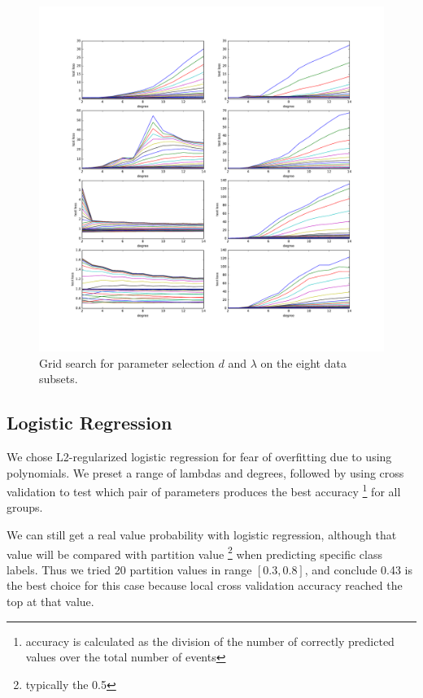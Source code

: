 \documentclass[10pt,conference,compsocconf]{IEEEtran}
\begin{document}
\begin{figure}[tbp] %
  \centering
  \includegraphics[width=\columnwidth]{img/cross_validation_lot.pdf}
  \caption{Grid search for parameter selection $d$ and $\lambda$ on the eight data subsets. }
  \vspace{-3mm}
  \label{param}
\end{figure}

\subsection{Logistic Regression}
We chose L2-regularized logistic regression for fear of overfitting due to using polynomials. We preset a range of lambdas and degrees, followed by using cross validation to test which pair of parameters produces the best accuracy \footnote{accuracy is calculated as the division of the number of correctly predicted values over the total number of events} for all groups. 

We can still get a real value probability with logistic regression, although that value will be compared with partition value \footnote{typically the 0.5} when predicting specific class labels. Thus we tried 20 partition values in range $[0.3, 0.8]$, and conclude 0.43 is the best choice for this case because local cross validation accuracy reached the top at that value.
\end{document}
